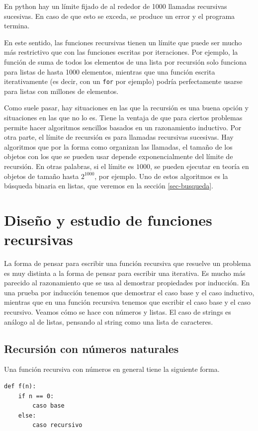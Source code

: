 \documentclass[a4paper, 12pt]{report}
\theoremstyle{definition}
\begin{document}
En python hay un límite fijado de al rededor de 1000 llamadas recursivas sucesivas. En caso de que esto se exceda, se produce un error y el programa termina.

En este sentido, las funciones recursivas tienen un límite que puede ser mucho más restrictivo que con las funciones escritas por iteraciones. Por ejemplo, la función de suma de todos los elementos de una lista por recursión solo funciona para listas de hasta 1000 elementos, mientras que una función escrita iterativamente (es decir, con un {\tt for} por ejemplo) podría perfectamente usarse para listas con millones de elementos.

Como suele pasar, hay situaciones en las que la recursión es una buena opción y situaciones en las que no lo es. Tiene la ventaja de que para ciertos problemas permite hacer algoritmos sencillos basados en un razonamiento inductivo. Por otra parte, el límite de recursión es para llamadas recursivas sucesivas. Hay algoritmos que por la forma como organizan las llamadas, el tamaño de los objetos con los que se pueden usar depende exponencialmente del límite de recursión. En otras palabras, si el límite es $1000$, se pueden ejecutar en teoría en objetos de tamaño hasta $2^{1000}$, por ejemplo. Uno de estos algoritmos es la búsqueda binaria en listas, que veremos en la sección \ref{sec-busqueda}.

\section{Diseño y estudio de funciones recursivas}

La forma de pensar para escribir una función recursiva que resuelve un problema es muy distinta a la forma de pensar para escribir una iterativa. Es mucho más parecido al razonamiento que se usa al demostrar propiedades por inducción. En una prueba por inducción tenemos que demostrar el caso base y el caso inductivo, mientras que en una función recursiva tenemos que escribir el caso base y el caso recursivo. Veamos cómo se hace con números y listas. El caso de strings es análogo al de listas, pensando al string como una lista de caracteres.

\subsection{Recursión con números naturales}

Una función recursiva con números en general tiene la siguiente forma.
\begin{verbatim}
def f(n):
    if n == 0:
        caso base
    else:
        caso recursivo
\end{verbatim}
\end{document}

